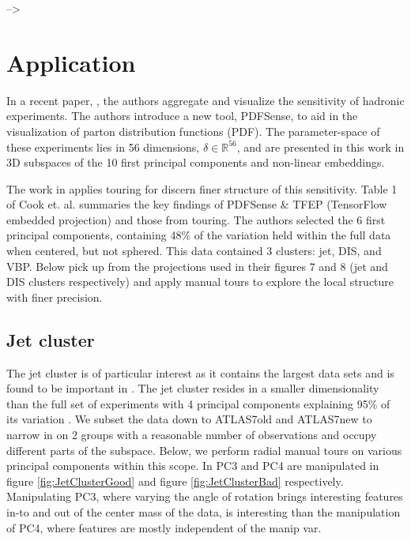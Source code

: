 \documentclass{monashthesis}
\begin{document}
--\textgreater{}

\section{Application}\label{sec:application}

In a recent paper, \textcite{wang_visualizing_2018}, the authors
aggregate and visualize the sensitivity of hadronic experiments. The
authors introduce a new tool, PDFSense, to aid in the visualization of
parton distribution functions (PDF). The parameter-space of these
experiments lies in 56 dimensions, \(\delta \in \mathbb{R}^{56}\), and
are presented in this work in 3D subspaces of the 10 first principal
components and non-linear embeddings.

The work in \textcite{cook_dynamical_2018} applies touring for discern
finer structure of this sensitivity. Table 1 of Cook et. al. summaries
the key findings of PDFSense \& TFEP (TensorFlow embedded projection)
and those from touring. The authors selected the 6 first principal
components, containing 48\% of the variation held within the full data
when centered, but not sphered. This data contained 3 clusters: jet,
DIS, and VBP. Below pick up from the projections used in their figures 7
and 8 (jet and DIS clusters respectively) and apply manual tours to
explore the local structure with finer precision.

\subsection{Jet cluster}\label{jet-cluster}

The jet cluster is of particular interest as it contains the largest
data sets and is found to be important in
\textcite{wang_visualizing_2018}. The jet cluster resides in a smaller
dimensionality than the full set of experiments with 4 principal
components explaining 95\% of its variation
\autocite{cook_dynamical_2018}. We subset the data down to ATLAS7old and
ATLAS7new to narrow in on 2 groups with a reasonable number of
observations and occupy different parts of the subspace. Below, we
perform radial manual tours on various principal components within this
scope. In PC3 and PC4 are manipulated in figure \ref{fig:JetClusterGood}
and figure \ref{fig:JetClusterBad} respectively. Manipulating PC3, where
varying the angle of rotation brings interesting features in-to and out
of the center mass of the data, is interesting than the manipulation of
PC4, where features are mostly independent of the manip var.
\end{document}
